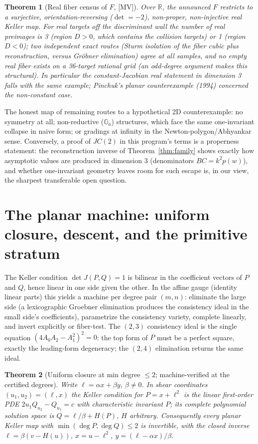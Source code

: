 \documentclass[11pt]{article}
\newtheorem{theorem}{Theorem}[section]
\theoremstyle{definition}
\theoremstyle{remark}
\begin{document}
\begin{theorem}[Real fiber census of $F$, {[MV]}]\label{thm:realcensus}
Over $\mathbb{R}$, the announced $F$ restricts to a surjective, orientation-reversing
($\det = -2$), non-proper, non-injective real Keller map. For real targets off the
discriminant wall the number of real preimages is 3 (region $D > 0$, which contains the
collision targets) or 1 (region $D < 0$); two independent exact routes (Sturm isolation of the
fiber cubic plus reconstruction, versus Gr\"obner elimination) agree at all samples, and no
empty real fiber exists on a 36-target rational grid (an odd-degree argument makes this
structural). In particular the constant-Jacobian \emph{real} statement in dimension 3 falls
with the same example; Pinchuk's planar counterexample (1994) concerned the non-constant case.
\end{theorem} The honest map of remaining
routes to a hypothetical 2D counterexample: no symmetry at all; non-reductive
($\mathbb{G}_a$) structures, which face the same one-invariant collapse in naive form; or
gradings at infinity in the Newton-polygon/Abhyankar sense. Conversely, a proof of $JC(2)$ in
this program's terms is a properness statement: the reconstruction inverse of
Theorem~\ref{thm:family} shows exactly how asymptotic values are produced in dimension 3
(denominators $BC = k^2 p(w)$), and whether one-invariant geometry leaves room for such escape
is, in our view, the sharpest transferable open question.

\section{The planar machine: uniform closure, descent, and the primitive stratum}

The Keller condition $\det J(P,Q) = 1$ is bilinear in the coefficient vectors of $P$ and $Q$,
hence linear in one side given the other. In the affine gauge (identity linear parts) this
yields a machine per degree pair $(m, n)$: eliminate the large side (a lexicographic Groebner
elimination produces the consistency ideal in the small side's coefficients), parametrize the
consistency variety, complete linearly, and invert explicitly or fiber-test. The $(2,3)$
consistency ideal is the single equation $(4A_0A_2 - A_1^2)^2 = 0$: the top form of $P$ must
be a perfect square, exactly the leading-form degeneracy; the $(2,4)$ elimination returns the
same ideal.

\begin{theorem}[Uniform closure at min degree $\le 2$; machine-verified at the certified
degrees]\label{thm:uniform}
Write $\ell = \alpha x + \beta y$, $\beta \ne 0$. In shear coordinates $(u_1, u_2) = (\ell, x)$
the Keller condition for $P = x + \ell^2$ is the linear first-order PDE
$2u_1 Q_{u_2} - Q_{u_1} = c$ with characteristic invariant $P$; its complete polynomial
solution space is $Q = \ell/\beta + H(P)$, $H$ arbitrary. Consequently every planar Keller map
with $\min(\deg P, \deg Q) \le 2$ is invertible, with the closed inverse
$\ell = \beta(v - H(u))$, $x = u - \ell^2$, $y = (\ell - \alpha x)/\beta$.
\end{theorem}
\end{document}
